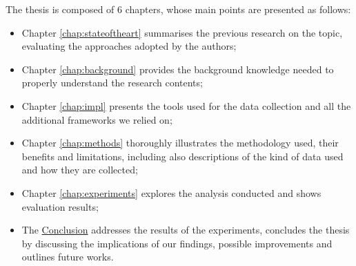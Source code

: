The thesis is composed of 6 chapters, whose main points are presented as follows:
\begin{itemize}
	\item Chapter \ref{chap:stateoftheart} summarises the previous research 
	on the topic, evaluating the approaches adopted by the authors;
	
	\item Chapter \ref{chap:background} provides the background knowledge 
	needed to properly understand the research contents;
	
	\item Chapter \ref{chap:impl} presents the tools used for the data collection 
	and all the additional frameworks we relied on;
		
	\item Chapter \ref{chap:methods} thoroughly illustrates the methodology used, 
	their benefits and limitations, including also descriptions of the kind of data 
	used and how they are collected;

	\item Chapter \ref{chap:experiments} explores the analysis conducted and 
	shows evaluation results;	
	
	\item The \hyperref[chap:concl]{Conclusion} addresses the results of the 
	experiments, concludes the thesis by discussing the implications of our findings, 
	possible improvements and outlines future works.
	
\end{itemize}

